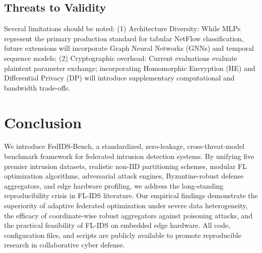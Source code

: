 \documentclass[runningheads]{llncs}
\begin{document}
\subsection{Threats to Validity}
Several limitations should be noted: (1) Architecture Diversity: While MLPs represent the primary production standard for tabular NetFlow classification, future extensions will incorporate Graph Neural Networks (GNNs) and temporal sequence models; (2) Cryptographic overhead: Current evaluations evaluate plaintext parameter exchange; incorporating Homomorphic Encryption (HE) and Differential Privacy (DP) will introduce supplementary computational and bandwidth trade-offs.

\section{Conclusion}
\label{sec:conclusion}
We introduce FedIDS-Bench, a standardized, zero-leakage, cross-threat-model benchmark framework for federated intrusion detection systems. By unifying five premier intrusion datasets, realistic non-IID partitioning schemes, modular FL optimization algorithms, adversarial attack engines, Byzantine-robust defense aggregators, and edge hardware profiling, we address the long-standing reproducibility crisis in FL-IDS literature. Our empirical findings demonstrate the superiority of adaptive federated optimization under severe data heterogeneity, the efficacy of coordinate-wise robust aggregators against poisoning attacks, and the practical feasibility of FL-IDS on embedded edge hardware. All code, configuration files, and scripts are publicly available to promote reproducible research in collaborative cyber defense.



\end{document}
